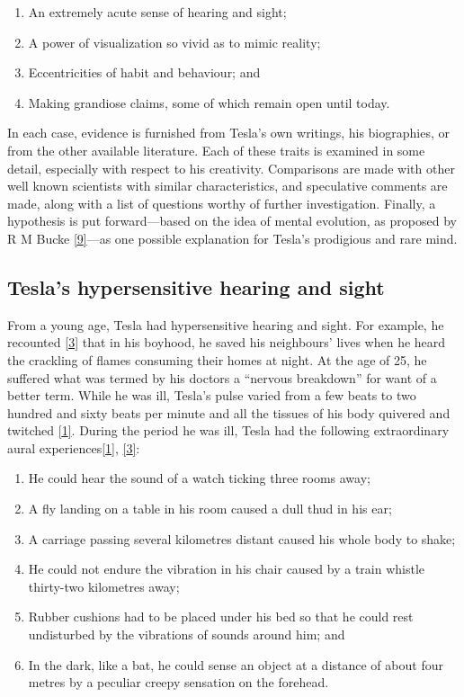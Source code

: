 \documentclass[
  a4paper,
]{article}
\providecommand{\tightlist}{%
  \setlength{\itemsep}{0pt}\setlength{\parskip}{0pt}}
\begin{document}
\begin{enumerate}
\tightlist
\item
  An extremely acute sense of hearing and sight;
\item
  A power of visualization so vivid as to mimic reality;
\item
  Eccentricities of habit and behaviour; and
\item
  Making grandiose claims, some of which remain open until today.
\end{enumerate}

In each case, evidence is furnished from Tesla's own writings, his
biographies, or from the other available literature. Each of these
traits is examined in some detail, especially with respect to his
creativity. Comparisons are made with other well known scientists with
similar characteristics, and speculative comments are made, along with a
list of questions worthy of further investigation. Finally, a hypothesis
is put forward---based on the idea of mental evolution, as proposed by R
M Bucke \protect\hyperlink{ref-bucke48}{{[}9{]}}---as one possible
explanation for Tesla's prodigious and rare mind.

\hypertarget{teslas-hypersensitive-hearing-and-sight}{%
\subsection{Tesla's hypersensitive hearing and
sight}\label{teslas-hypersensitive-hearing-and-sight}}

From a young age, Tesla had hypersensitive hearing and sight. For
example, he recounted \protect\hyperlink{ref-cheney81}{{[}3{]}} that in
his boyhood, he saved his neighbours' lives when he heard the crackling
of flames consuming their homes at night. At the age of 25, he suffered
what was termed by his doctors a ``nervous breakdown'' for want of a
better term. While he was ill, Tesla's pulse varied from a few beats to
two hundred and sixty beats per minute and all the tissues of his body
quivered and twitched \protect\hyperlink{ref-john83}{{[}1{]}}. During
the period he was ill, Tesla had the following extraordinary aural
experiences\protect\hyperlink{ref-john83}{{[}1{]}},
\protect\hyperlink{ref-cheney81}{{[}3{]}}:

\begin{enumerate}
\item
  He could hear the sound of a watch ticking three rooms away;
\item
  A fly landing on a table in his room caused a dull thud in his ear;
\item
  A carriage passing several kilometres distant caused his whole body to
  shake;
\item
  He could not endure the vibration in his chair caused by a train
  whistle thirty-two kilometres away;
\item
  Rubber cushions had to be placed under his bed so that he could rest
  undisturbed by the vibrations of sounds around him; and
\item
  In the dark, like a bat, he could sense an object at a distance of
  about four metres by a peculiar creepy sensation on the forehead.
\end{enumerate}
\end{document}
